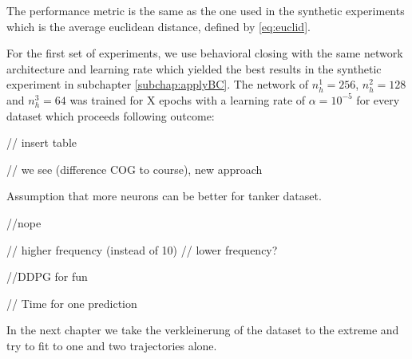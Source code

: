 The performance metric is the same as the one used in the synthetic experiments which is the average euclidean distance, defined by \ref{eq:euclid}.
\par
For the first set of experiments, we use behavioral closing with the same network architecture and learning rate which yielded the best results in the synthetic experiment in subchapter \ref{subchap:applyBC}. The network of $n_h^1=256$, $n_h^2=128$ and $n_h^3=64$ was trained for X epochs with a learning rate of $\alpha=10^{-5}$ for every dataset which proceeds following outcome:

// insert table


// we see (difference COG to course), new approach


Assumption that more neurons can be better for tanker dataset.

//nope



// higher frequency (instead of 10)
// lower frequency?

//DDPG for fun


// Time for one prediction

In the next chapter we take the verkleinerung of the dataset to the extreme and try to fit to one and two trajectories alone. 